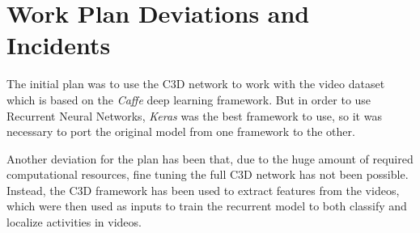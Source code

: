 \section{Work Plan Deviations and Incidents}
\label{section:work_plan_deviations}

The initial plan was to use the C3D\cite{tran2014learning} network to work with the video dataset which is based on the \textit{Caffe} deep learning framework. But in order to use Recurrent Neural Networks, \textit{Keras} was the best framework to use, so it was necessary to port the original model from one framework to the other.

Another deviation for the plan has been that, due to the huge amount of required computational resources, fine tuning the full C3D network has not been possible. Instead, the C3D framework has been used to extract features from the videos, which were then used as inputs to train the recurrent model to both classify and localize activities in videos.
